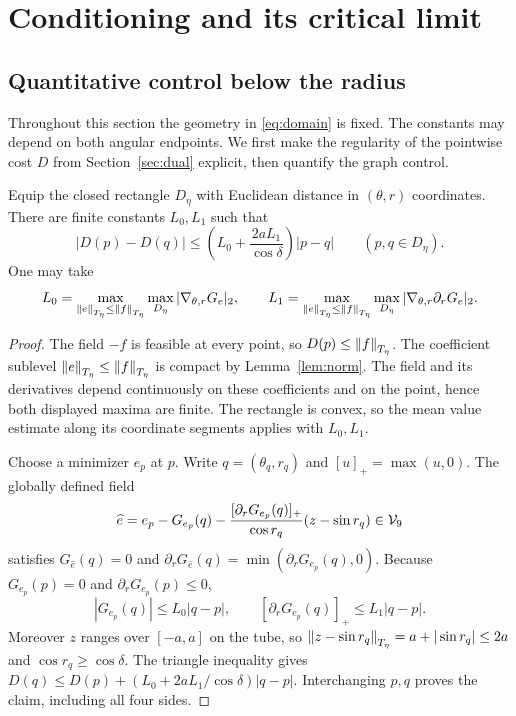 \documentclass[11pt,a4paper]{article}
\begin{document}
\section{Conditioning and its critical limit}\label{sec:quantitative}

\subsection{Quantitative control below the radius}\label{sec:conditioning}

Throughout this section the geometry in \eqref{eq:domain} is fixed.
The constants may depend on both angular endpoints. We first make
the regularity of the pointwise cost $D$ from Section~\ref{sec:dual}
explicit, then quantify the graph control.

\begin{proposition}
\label{prop:Dlip}
Equip the closed rectangle $D_\eta$ with Euclidean distance in
$(\theta,r)$ coordinates. There are finite constants $L_0,L_1$
such that
\begin{equation}\label{eq:Dlip}
 |D(p)-D(q)|\le
 \left(L_0+\frac{2aL_1}{\cos\delta}\right)|p-q|
 \qquad(p,q\in D_\eta).
\end{equation}
One may take
\[
 L_0=\max_{\left\lVert e\right\rVert_{T_\eta}\le\left\lVert f\right\rVert_{T_\eta}}\max_{D_\eta}
       |\nabla_{\theta,r}G_e|_2,\qquad
 L_1=\max_{\left\lVert e\right\rVert_{T_\eta}\le\left\lVert f\right\rVert_{T_\eta}}\max_{D_\eta}
       |\nabla_{\theta,r}\partial_rG_e|_2.
\]
\end{proposition}
\begin{proof}
The field $-f$ is feasible at every point, so $D(p)\le\left\lVert f\right\rVert_{T_\eta}$.
The coefficient sublevel $\left\lVert e\right\rVert_{T_\eta}\le\left\lVert f\right\rVert_{T_\eta}$ is compact by
Lemma~\ref{lem:norm}. The field and its derivatives depend continuously
on these coefficients and on the point, hence both displayed maxima
are finite. The rectangle is convex, so the mean value estimate along
its coordinate segments applies with $L_0,L_1$.

Choose a minimizer $e_p$ at $p$. Write $q=(\theta_q,r_q)$ and
$[u]_+=\max(u,0)$. The globally defined field
\[
 \widehat e=e_p-G_{e_p}(q)
 -\frac{[\partial_rG_{e_p}(q)]_+}{\cos r_q}
       (z-\sin r_q)\in\mathcal V_9
\]
satisfies $G_{\widehat e}(q)=0$ and
$\partial_rG_{\widehat e}(q)=\min(\partial_rG_{e_p}(q),0)$.
Because $G_{e_p}(p)=0$ and $\partial_rG_{e_p}(p)\le0$,
\[
 |G_{e_p}(q)|\le L_0|q-p|,\qquad
 [\partial_rG_{e_p}(q)]_+\le L_1|q-p|.
\]
Moreover $z$ ranges over $[-a,a]$ on the tube, so
$\left\lVert z-\sin r_q\right\rVert_{T_\eta}=a+|\sin r_q|\le2a$ and
$\cos r_q\ge\cos\delta$. The triangle inequality gives
$D(q)\le D(p)+(L_0+2aL_1/\cos\delta)|q-p|$.
Interchanging $p,q$ proves the claim, including all four sides.
\end{proof}
\end{document}
